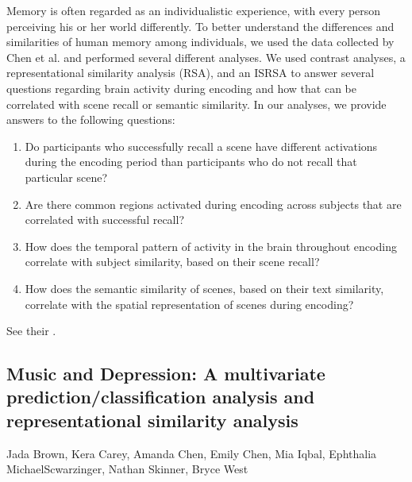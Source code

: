 \documentclass[letterpaper,10pt,english]{sphinxmanual}
\begin{document}
Memory is often regarded as an individualistic experience, with every person perceiving his or her world differently. To better understand the differences and similarities of human memory among individuals, we used the data collected by Chen et al. and performed several different analyses. We used contrast analyses, a representational similarity analysis (RSA), and an IS\sphinxhyphen{}RSA to answer several questions regarding brain activity during encoding and how that can be correlated with scene recall or semantic similarity. In our analyses, we provide answers to the following questions:
\begin{enumerate}
%
\item {} 
Do participants who successfully recall a scene have different activations during the encoding period than participants who do not recall that particular scene?

\item {} 
Are there common regions activated during encoding across subjects that are correlated with successful recall?

\item {} 
How does the temporal pattern of activity in the brain throughout encoding correlate with subject similarity, based on their scene recall?

\item {} 
How does the semantic similarity of scenes, based on their text similarity, correlate with the spatial representation of scenes during encoding?

\end{enumerate}

See their .


\subsection{Music and Depression: A multivariate prediction/classification analysis and representational similarity analysis}
\label{\detokenize{content/2020_Spring:music-and-depression-a-multivariate-prediction-classification-analysis-and-representational-similarity-analysis}}
Jada Brown, Kera Carey, Amanda Chen, Emily Chen, Mia Iqbal, Ephthalia Michael\sphinxhyphen{}Scwarzinger, Nathan Skinner, Bryce West
\end{document}
